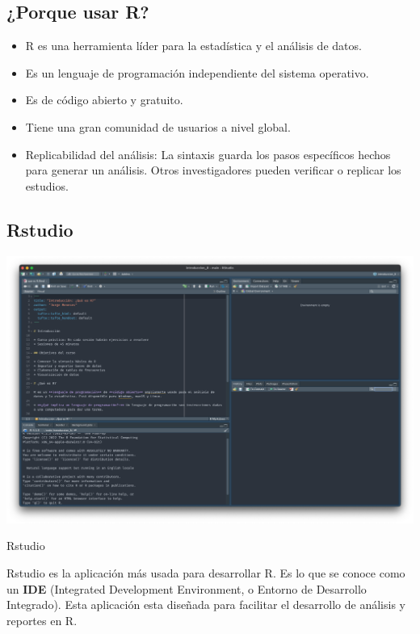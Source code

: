 \documentclass[]{tufte-handout}
\providecommand{\tightlist}{%
  \setlength{\itemsep}{0pt}\setlength{\parskip}{0pt}}
\begin{document}
\hypertarget{porque-usar-r}{%
\subsection{¿Porque usar R?}\label{porque-usar-r}}

\begin{itemize}
\tightlist
\item
  R es una herramienta líder para la estadística y el análisis de datos.
\item
  Es un lenguaje de programación independiente del sistema operativo.
\item
  Es de código abierto y gratuito.
\item
  Tiene una gran comunidad de usuarios a nivel global.
\item
  Replicabilidad del análisis: La sintaxis guarda los pasos específicos
  hechos para generar un análisis. Otros investigadores pueden verificar
  o replicar los estudios.
\end{itemize}

\hypertarget{rstudio}{%
\subsection{Rstudio}\label{rstudio}}

\begin{marginfigure}
\includegraphics[width=24.64in]{../../public/img/01 - Rstudio} \caption[Rstudio]{Rstudio}\label{fig:unnamed-chunk-2}
\end{marginfigure}

Rstudio es la aplicación más usada para desarrollar R. Es lo que se
conoce como un \textbf{IDE} (Integrated Development Environment, o
Entorno de Desarrollo Integrado). Esta aplicación esta diseñada para
facilitar el desarrollo de análisis y reportes en R.
\end{document}
